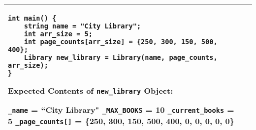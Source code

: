 \begin{longtable}{|p{1.7in}|p{4.3in}|}
\begin{example}
\begin{verbatim}
int main() {
    string name = "City Library";
    int arr_size = 5;
    int page_counts[arr_size] = {250, 300, 150, 500, 400};
    Library new_library = Library(name, page_counts, arr_size);
}
\end{verbatim}
\end{example}

\textbf{Expected Contents of \texttt{new_library} Object:}

\vspace{5pt}
\texttt{_name} = ``City Library" \newline
\texttt{_MAX_BOOKS} = 10 \newline
\texttt{_current_books} = 5 \newline
\texttt{_page_counts[]} = \{250, 300, 150, 500, 400, 0, 0, 0, 0, 0\}
\vspace{5pt}
\\ \hline
\end{longtable}



